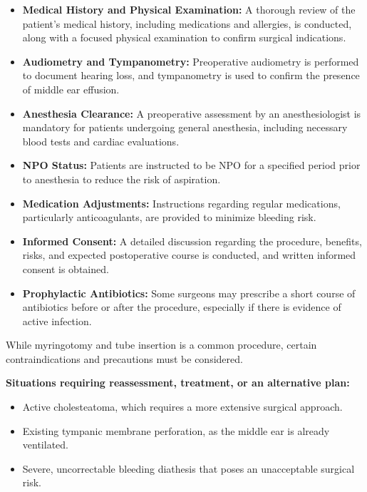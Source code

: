 \begin{itemize}
  \item \textbf{Medical History and Physical Examination:} A thorough review of the patient's medical history, including medications and allergies, is conducted, along with a focused physical examination to confirm surgical indications.
  
  \item \textbf{Audiometry and Tympanometry:} Preoperative audiometry is performed to document hearing loss, and tympanometry is used to confirm the presence of middle ear effusion.
  
  \item \textbf{Anesthesia Clearance:} A preoperative assessment by an anesthesiologist is mandatory for patients undergoing general anesthesia, including necessary blood tests and cardiac evaluations.
  
  \item \textbf{NPO Status:} Patients are instructed to be NPO for a specified period prior to anesthesia to reduce the risk of aspiration.
  
  \item \textbf{Medication Adjustments:} Instructions regarding regular medications, particularly anticoagulants, are provided to minimize bleeding risk.
  
  \item \textbf{Informed Consent:} A detailed discussion regarding the procedure, benefits, risks, and expected postoperative course is conducted, and written informed consent is obtained.
  
  \item \textbf{Prophylactic Antibiotics:} Some surgeons may prescribe a short course of antibiotics before or after the procedure, especially if there is evidence of active infection.
\end{itemize}

While myringotomy and tube insertion is a common procedure, certain contraindications and precautions must be considered.

\textbf{Situations requiring reassessment, treatment, or an alternative plan:}
\begin{itemize}
  \item Active cholesteatoma, which requires a more extensive surgical approach.
  \item Existing tympanic membrane perforation, as the middle ear is already ventilated.
  \item Severe, uncorrectable bleeding diathesis that poses an unacceptable surgical risk.
\end{itemize}


